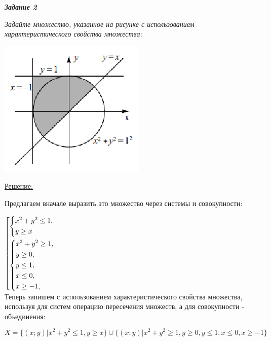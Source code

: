 \documentclass[11pt]{article}
\begin{document}
\pagebreak

\textit{\textbf{Задание 2}}

\textit{Задайте множество, указанное на рисунке с использованием
характеристического свойства множества:}

\includegraphics{task2}

\underline{Решение:}

Предлагаем вначале выразить это множество через системы и
совокупности:

$\left[ 
  \begin{gathered} 
    \left\{ 
      \begin{gathered} 
		  x^2 + y^2 \leq 1, \hfill 
        \\ 
        y \geq x \hfill 
        \\ 
      \end{gathered} 
    \right. \hfill 
    \\ 
    \left\{ 
      \begin{gathered} 
		  x^2+y^2 \geq 1, \hfill 
        \\ 
        y \geq 0, \hfill 
        \\ 
        y \leq 1, \hfill 
        \\ 
        x \leq 0, \hfill 
        \\ 
        x \geq -1, \hfill 
        \\ 
      \end{gathered} 
    \right. \hfill 
    \\ 
  \end{gathered} 
\right.$
\\[3pt]

Теперь запишем с использованием характеристического
свойства множества, используя для систем операцию пересечения
множеств, а для совокупности - объединения:

$$X=\{(x;y) \vert x^2+y^2 \leq 1, y \geq x\} \cup \{(x;y)\vert
x^2 + y^2 \geq 1, y \geq 0, y \leq 1, x \leq 0, x \geq -1\}$$
\end{document}
